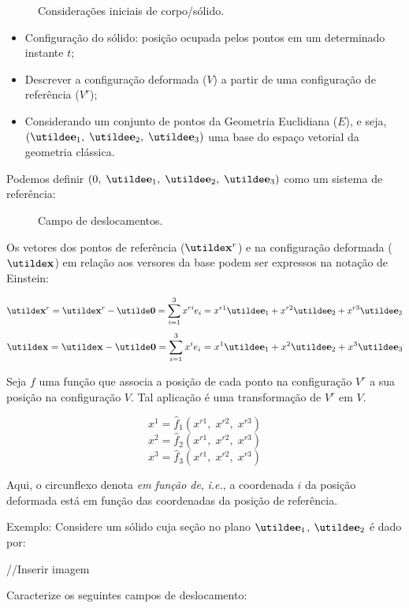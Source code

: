 \begin{figure}[H]
	\centering
	\caption{Considerações iniciais de corpo/sólido.}
	\vspace*{5mm}
	
\end{figure}

\begin{itemize}
	\item Configuração do sólido: posição ocupada pelos pontos em um determinado instante $t$;
	\item Descrever a configuração deformada ($V$) a partir de uma configuração de referência ($V^r$);
	\item \sloppy Considerando um conjunto de pontos da Geometria Euclidiana ($E$), e seja, $(\vt{e}_1,\;\vt{e}_2,\;\vt{e}_3)$ uma base do espaço vetorial da geometria clássica.
\end{itemize}
	
Podemos definir $(0,\;\vt{e}_1,\;\vt{e}_2,\;\vt{e}_3)$ como um sistema de referência:

\begin{figure}[H]
	\centering
	\caption{Campo de deslocamentos.}
	
\end{figure}
	
Os vetores dos pontos de referência ($\vt{x}^r$) e na configuração deformada ($\vt{x}$) em relação aos versores da base podem ser expressos na notação de Einstein:

\[\vt{x}^r=\vt{x}^r-\vt{0}=\sum_{i=1}^3x^{ri}e_i=x^{r1}\vt{e}_1+x^{r2}\vt{e}_2+x^{r3}\vt{e}_3\]
\[\vt{x}=\vt{x}-\vt{0}=\sum_{i=1}^3x^ie_i=x^1\vt{e}_1+x^2\vt{e}_2+x^3\vt{e}_3\]

Seja $f$ uma função que associa a posição de cada ponto na configuração $V^r$ a sua posição na configuração $V$. Tal aplicação é uma transformação de $V^r$ em $V$.
	
\[x^1=\hat{f}_1(x^{r1},\;x^{r2},\;x^{r3})\]
\[x^2=\hat{f}_2(x^{r1},\;x^{r2},\;x^{r3})\]
\[x^3=\hat{f}_3(x^{r1},\;x^{r2},\;x^{r3})\]

Aqui, o circunflexo denota \textit{em função de}, \textit{i.e.}, a coordenada $i$ da posição deformada está em função das coordenadas da posição de referência.
	
Exemplo: Considere um sólido cuja seção no plano $\vt{e}_1$, $\vt{e}_2$ é dado por:
	
//Inserir imagem
	
Caracterize os seguintes campos de deslocamento:
	
